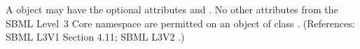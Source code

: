 A \ListOfModifierSpeciesReferences object may have the optional attributes
  and .  No other attributes from the SBML
Level~3 Core namespace are permitted on an object of class
\ListOfModifierSpeciesReferences.  (References: SBML L3V1 Section 4.11; SBML L3V2
.)
